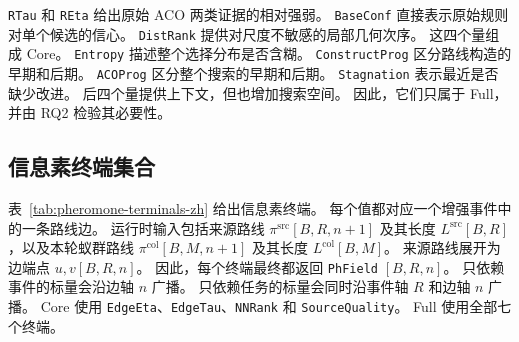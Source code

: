 \documentclass[letterpaper,journal]{IEEEtran}
\begin{document}
\texttt{RTau} 和 \texttt{REta} 给出原始 ACO 两类证据的相对强弱。
\texttt{BaseConf} 直接表示原始规则对单个候选的信心。
\texttt{DistRank} 提供对尺度不敏感的局部几何次序。
这四个量组成 Core。
\texttt{Entropy} 描述整个选择分布是否含糊。
\texttt{ConstructProg} 区分路线构造的早期和后期。
\texttt{ACOProg} 区分整个搜索的早期和后期。
\texttt{Stagnation} 表示最近是否缺少改进。
后四个量提供上下文，但也增加搜索空间。
因此，它们只属于 Full，并由 RQ2 检验其必要性。

\subsection{信息素终端集合}

表~\ref{tab:pheromone-terminals-zh} 给出信息素终端。
每个值都对应一个增强事件中的一条路线边。
运行时输入包括来源路线
\(\pi^{\mathrm{src}}[B,R,n+1]\) 及其长度
\(L^{\mathrm{src}}[B,R]\)，以及本轮蚁群路线
\(\pi^{\mathrm{col}}[B,M,n+1]\) 及其长度
\(L^{\mathrm{col}}[B,M]\)。
来源路线展开为边端点 \(u,v[B,R,n]\)。
因此，每个终端最终都返回
\texttt{PhField} \([B,R,n]\)。
只依赖事件的标量会沿边轴 \(n\) 广播。
只依赖任务的标量会同时沿事件轴 \(R\) 和边轴 \(n\) 广播。
Core 使用 \texttt{EdgeEta}、\texttt{EdgeTau}、\texttt{NNRank} 和
\texttt{SourceQuality}。
Full 使用全部七个终端。
\end{document}
